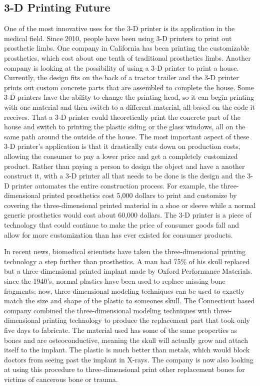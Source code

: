 \documentclass[pdftex,10.5pt]{report}
\begin{document}
\subsection{3-D Printing Future}
One of the most innovative uses for the 3-D printer is its application in the medical field. Since 2010, people have been using 3-D printers to print out prosthetic limbs. One company in California has been printing the customizable prosthetics, which cost about one tenth of traditional prosthetics limbs. Another company is looking at the possibility of using a 3-D printer to print a house. Currently, the design fits on the back of a tractor trailer and the 3-D printer prints out custom concrete parts that are assembled to complete the house. Some 3-D printers have the ability to change the printing head, so it can begin printing with one material and then switch to a different material, all based on the code it receives. That a 3-D printer could theoretically print the concrete part of the house and switch to printing the plastic siding or the glass windows, all on the same path around the outside of the house. The most important aspect of these 3-D printer's application is that it drastically cuts down on production costs, allowing the consumer to pay a lower price and get a completely customized product. Rather than paying a person to design the object and have a another construct it, with a 3-D printer all that needs to be done is the design and the 3-D printer automates the entire construction process. For example, the three-dimensional printed prosthetics cost 5,000 dollars to print and customize by covering the three-dimensional printed material in a shoe or sleeve while a normal generic prosthetics would cost about 60,000 dollars.\cite{cite5} The 3-D printer is a piece of technology that could continue to make the price of consumer goods fall and allow for more customization than has ever existed for consumer products.

In recent news, biomedical scientists have taken the three-dimensional printing technology a step further than prosthetics. A man had 75\% of his skull replaced but a three-dimensional printed implant made by Oxford Performance Materials. since the 1940's, normal plastics have been used  to replace missing bone fragments; now, three-dimensional modeling techniques can be used to exactly match the size and shape of the plastic to someones skull. The Connecticut based company combined the three-dimensional modeling techniques with three-dimensional printing technology to produce the replacement part that took only five days to fabricate.\cite{cite9} The material used has some of the same properties as bones and are osteoconductive, meaning the skull will actually grow and attach itself to the implant. The plastic is much better than metals, which would block doctors from seeing past the implant in X-rays. The company is now also looking at using this procedure to three-dimensional print other replacement bones for victims of cancerous bone or trauma.
\end{document}

